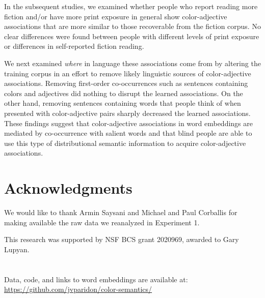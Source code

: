 \documentclass[10pt,letterpaper]{article}
\begin{document}
In the subsequent studies, we examined whether people who report reading more fiction and/or have more print exposure in general show color-adjective associations that are more similar to those recoverable from the fiction corpus. No clear differences were found between people with different levels of print exposure or differences in self-reported fiction reading. 

We next examined \emph{where} in language these associations come from by altering the training corpus in an effort to remove likely linguistic sources of color-adjective associations. Removing first-order co-occurrences such as sentences containing colors and adjectives did nothing to disrupt the learned associations. On the other hand, removing sentences containing words that people think of when presented with color-adjective pairs sharply decreased the learned associations. These findings suggest that color-adjective associations in word embeddings are mediated by co-occurrence with salient words and that blind people are able to use this type of distributional semantic information to acquire color-adjective associations.

\section{Acknowledgments}
We would like to thank Armin Saysani and Michael and Paul Corballis for making available the raw data we reanalyzed in Experiment 1.

This research was supported by NSF BCS grant 2020969, awarded to Gary Lupyan.

\section{}
Data, code, and links to word embeddings are available at: \url{https://github.com/jvparidon/color-semantics/}



\setlength{\bibleftmargin}{.125in}
\setlength{\bibindent}{-\bibleftmargin}


\end{document}
